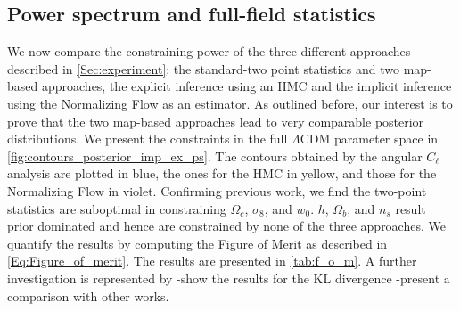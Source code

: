 \documentclass{aa}
\begin{document}
\subsection{Power spectrum and full-field statistics}
We now compare the constraining power of the three different approaches described in \autoref{Sec:experiment}: the standard-two point statistics and two map-based approaches, the explicit inference using an HMC and the implicit inference using the Normalizing Flow as an estimator. 
As outlined before, our interest is to prove that the two map-based approaches lead to very comparable posterior distributions. We present the constraints in the full $\Lambda$CDM parameter space in \autoref{fig:contours_posterior_imp_ex_ps}. The contours obtained by the angular $C_{\ell}$ analysis are plotted in blue, the ones for the HMC in yellow, and those for the Normalizing Flow in violet. Confirming previous work, we find the two-point statistics are suboptimal in constraining $\Omega_c$, $\sigma_8$, and $w_0$. $h$, $\Omega_b$, and $n_s$ result prior dominated and hence are constrained by none of the three approaches. 
 We quantify the results by computing the Figure of Merit as described in \autoref{Eq:Figure_of_merit}. The results are presented in \autoref{tab:f_o_m}. 
A further investigation is represented by 
-show the results for the KL divergence 
-present a comparison with other works. 
\end{document}

